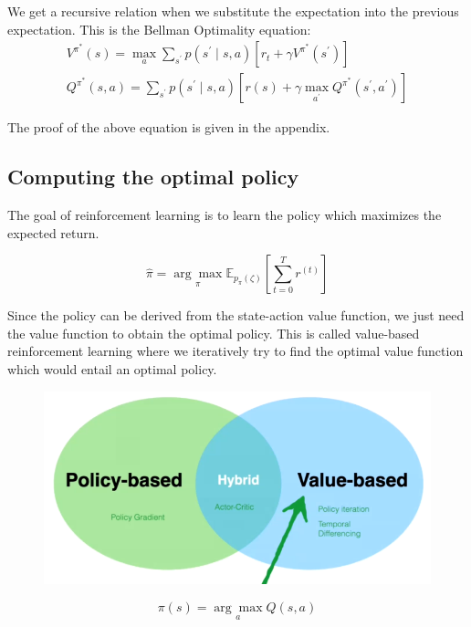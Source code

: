 \documentclass[11pt]{article}
\begin{document}
We get a recursive relation when we substitute the expectation into the previous expectation. This is the Bellman Optimality equation:
$$
\begin{array}{c}
V^{\pi^{*}}(s)=\max _{a} \sum_{s^{\prime}} p\left(s^{\prime} \mid s, a\right)\left[r_{t}+\gamma V^{\pi^{*}}\left(s^{\prime}\right)\right] \\
Q^{\pi^{*}}(s, a)=\sum_{s^{\prime}} p\left(s^{\prime} \mid s, a\right)\left[r(s)+\gamma \max _{a^{\prime}} Q^{\pi^{*}}\left(s^{\prime}, a^{\prime}\right)\right]
\end{array}
$$

The proof of the above equation is given in the appendix.

\subsection*{Computing the optimal policy}
The goal of reinforcement learning is to learn the policy which maximizes the expected return. 

\begin{equation}
    \hat{\pi}=\underset{\pi}{\arg \max } \mathbb{E}_{p_{\pi}(\zeta)}\left[\sum_{t=0}^{T} r^{(t)}\right]
\end{equation}

Since the policy can be derived from the state-action value function, we just need the value function to obtain the optimal policy. 
This is called value-based reinforcement learning where we iteratively try to find the optimal value function which would entail an optimal policy.

\begin{figure}[H]
    \centering
    \includegraphics[scale=0.4]{images/types of RL.png}
    \label{fig:my_label}
\end{figure}

\begin{equation}
    \pi(s)=\underset{a}{\arg \max } Q(s, a)
\end{equation}
\end{document}
